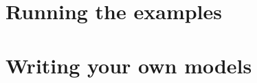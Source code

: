 \documentclass[a4paper, 11pt]{article}
\begin{document}




\section{Running the examples}


\section{Writing your own models}
\end{document}
